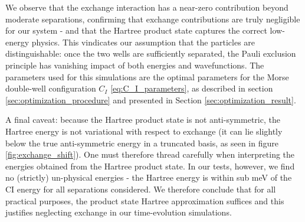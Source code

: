 \documentclass{subfiles}
\begin{document}
We observe that the exchange interaction has a near-zero contribution beyond moderate separations, confirming that exchange contributions are truly negligible for our system - and that the Hartree product state captures the correct low-energy physics. This vindicates our assumption that the particles are distinguishable: once the two wells are sufficiently separated, the Pauli exclusion principle has vanishing impact of both energies and wavefunctions. The parameters used for this simulations are the optimal parameters for the Morse double-well configuration $C_I$ \eqref{eq:C_I_parameters}, as described in section \ref{sec:optimization_procedure} and presented in Section \ref{sec:optimization_result}. 

A final caveat: because the Hartree product state is not anti-symmetric, the Hartree energy is not variational with respect to exchange (it can lie slightly below the true anti-symmetric energy in a truncated basis, as seen in figure \ref{fig:exchange_shift}). One must therefore thread carefully when interpreting the energies obtained from the Hartree product state. In our tests, however, we find no (strictly) un-physical energies - the Hartree energy is within sub meV of the CI energy for all separations considered. We therefore conclude that for all practical purposes, the product state Hartree approximation suffices and this justifies neglecting exchange in our time-evolution simulations. 
\end{document}
